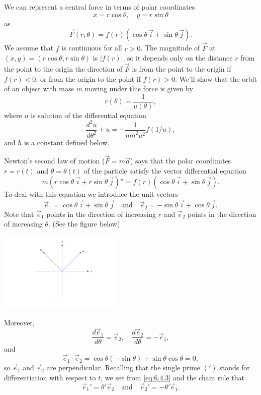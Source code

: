 \documentclass{ximera}
\begin{document}
We can represent a central force in terms of polar coordinates
$$
x=r\cos\theta,\quad y=r\sin\theta
$$
 as
$$
\vec{F}(r,\theta)=f(r)(\cos\theta\,\vec{i}+\sin\theta\,\vec{j}).
$$
We assume that $f$ is continuous for all $r>0$. The magnitude of $\vec{F}$ at $(x,y)=(r\cos\theta,r\sin\theta)$ is $|f(r)|$, so it depends
only on the distance $r$ from the point to the origin   the direction
of $\vec{F}$ is from the point to the origin if $f(r)<0$, or from the
origin to the point if $f(r)>0$. We'll show that the orbit of an
object with mass $m$ moving under this force is given by
$$
r(\theta)=\frac{1}{u(\theta)},
$$
where $u$  is solution of the differential equation
\begin{equation} \label{eq:6.4.1}
 \frac{d^2u}{d\theta^2}+u=-\frac{1}{mh^2u^2}f(1/u),
\end{equation}
and $h$ is a constant defined below.



Newton's second law of motion ($\vec{F}=m\vec{a}$) says that the polar
coordinates
$r=r(t)$ and $\theta=\theta(t)$ of
the particle  satisfy the vector differential equation
\begin{equation} \label{eq:6.4.2}
m(r\cos\theta\,\vec{i}+r\sin\theta\,\vec{j})''=
f(r)(\cos\theta\,\vec{i}+\sin\theta\,\vec{j}).
\end{equation}
To deal with this equation we introduce  the unit vectors
$$
\vec{e}_1=\cos\theta\,\vec{i}+\sin\theta\,\vec{j}
\quad\mbox{and}\quad
\vec{e}_2=-\sin\theta\,\vec{i}+\cos\theta\,\vec{j}.
$$
Note that   $\vec{e}_1$ points in the
direction of increasing $r$ and $\vec{e}_2$ points in the
direction of increasing $\theta$.  (See the figure below)

\begin{image}
 \includegraphics[height=1.5in]{fig060402.jpg}
 \end{image}

Moreover,
\begin{equation} \label{eq:6.4.3}
\frac{d\vec{e}_1}{d\theta}=\vec{e}_2,\quad
\frac{d\vec{e}_2}{d\theta}=-\vec{e}_1,
\end{equation}
and
$$
\vec{e}_1\cdot\vec{e}_2=\cos\theta(-\sin\theta)+\sin\theta\cos\theta=0,
$$
so $\vec{e}_1$ and $\vec{e}_2$ are  perpendicular.
Recalling that the single prime $(')$ stands for differentiation with
respect to
$t$, we see from \eqref{eq:6.4.3}  and the chain rule that
\begin{equation} \label{eq:6.4.4}
\vec{e}_1'=\theta'\vec{e}_2\quad\mbox{and}\quad
\vec{e}_2'=-\theta'\vec{e}_1.
\end{equation}
\end{document}

